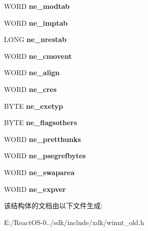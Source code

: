 \begin{DoxyCompactItemize}
\item 
\mbox{\label{struct___i_m_a_g_e___o_s2___h_e_a_d_e_r_ae44f6f069474fccec6d013c50acd2ef9}} 
W\+O\+RD {\bfseries ne\+\_\+modtab}
\item 
\mbox{\label{struct___i_m_a_g_e___o_s2___h_e_a_d_e_r_a98e77bba4e17d6b13a1979ba5fb86a8d}} 
W\+O\+RD {\bfseries ne\+\_\+imptab}
\item 
\mbox{\label{struct___i_m_a_g_e___o_s2___h_e_a_d_e_r_afd29913eebd711b37515c25e869b6610}} 
L\+O\+NG {\bfseries ne\+\_\+nrestab}
\item 
\mbox{\label{struct___i_m_a_g_e___o_s2___h_e_a_d_e_r_a41707eed766fd1770d5ba1694504ffbd}} 
W\+O\+RD {\bfseries ne\+\_\+cmovent}
\item 
\mbox{\label{struct___i_m_a_g_e___o_s2___h_e_a_d_e_r_a1e796a00a65b1a59a94535acb6a6ac3f}} 
W\+O\+RD {\bfseries ne\+\_\+align}
\item 
\mbox{\label{struct___i_m_a_g_e___o_s2___h_e_a_d_e_r_a10c5117c2fe1a580ac12e5a330fe9162}} 
W\+O\+RD {\bfseries ne\+\_\+cres}
\item 
\mbox{\label{struct___i_m_a_g_e___o_s2___h_e_a_d_e_r_a0a7e769ac9f4562165472a31d3c76195}} 
B\+Y\+TE {\bfseries ne\+\_\+exetyp}
\item 
\mbox{\label{struct___i_m_a_g_e___o_s2___h_e_a_d_e_r_a17d22562c67aaf6349a3af6644243b9b}} 
B\+Y\+TE {\bfseries ne\+\_\+flagsothers}
\item 
\mbox{\label{struct___i_m_a_g_e___o_s2___h_e_a_d_e_r_a6eb80d373f7e8fb1408ca4cb5d7d22bc}} 
W\+O\+RD {\bfseries ne\+\_\+pretthunks}
\item 
\mbox{\label{struct___i_m_a_g_e___o_s2___h_e_a_d_e_r_a64598d7c8def9cca4fd6c5f467632fcc}} 
W\+O\+RD {\bfseries ne\+\_\+psegrefbytes}
\item 
\mbox{\label{struct___i_m_a_g_e___o_s2___h_e_a_d_e_r_a9b238a32e5369663d385c58b67cb213e}} 
W\+O\+RD {\bfseries ne\+\_\+swaparea}
\item 
\mbox{\label{struct___i_m_a_g_e___o_s2___h_e_a_d_e_r_adfea5ce0e245592aef1090089a21add5}} 
W\+O\+RD {\bfseries ne\+\_\+expver}
\end{DoxyCompactItemize}


该结构体的文档由以下文件生成\+:\begin{DoxyCompactItemize}
\item 
E\+:/\+React\+O\+S-\/0../sdk/include/xdk/winnt\+\_\+old.\+h\end{DoxyCompactItemize}
